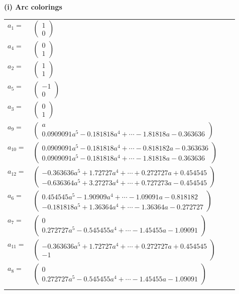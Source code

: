 \documentclass[1p]{elsarticle_modified}
\theoremstyle{definition}
\begin{document}
\flushleft \textbf{(i) Arc colorings}\\
\begin{tabular}{m{7pt} m{180pt} m{7pt} m{180pt} }
\flushright $a_{1}=$&$\begin{pmatrix}1\\0\end{pmatrix}$ \\
\flushright $a_{4}=$&$\begin{pmatrix}0\\1\end{pmatrix}$ \\
\flushright $a_{2}=$&$\begin{pmatrix}1\\1\end{pmatrix}$ \\
\flushright $a_{5}=$&$\begin{pmatrix}-1\\0\end{pmatrix}$ \\
\flushright $a_{3}=$&$\begin{pmatrix}0\\1\end{pmatrix}$ \\
\flushright $a_{9}=$&$\begin{pmatrix}a\\0.0909091 a^{5}-0.181818 a^{4}+\cdots-1.81818 a-0.363636\end{pmatrix}$ \\
\flushright $a_{10}=$&$\begin{pmatrix}0.0909091 a^{5}-0.181818 a^{4}+\cdots-0.818182 a-0.363636\\0.0909091 a^{5}-0.181818 a^{4}+\cdots-1.81818 a-0.363636\end{pmatrix}$ \\
\flushright $a_{12}=$&$\begin{pmatrix}-0.363636 a^{5}+1.72727 a^{4}+\cdots+0.272727 a+0.454545\\-0.636364 a^{5}+3.27273 a^{4}+\cdots+0.727273 a-0.454545\end{pmatrix}$ \\
\flushright $a_{6}=$&$\begin{pmatrix}0.454545 a^{5}-1.90909 a^{4}+\cdots-1.09091 a-0.818182\\-0.181818 a^{5}+1.36364 a^{4}+\cdots-1.36364 a-0.272727\end{pmatrix}$ \\
\flushright $a_{7}=$&$\begin{pmatrix}0\\0.272727 a^{5}-0.545455 a^{4}+\cdots-1.45455 a-1.09091\end{pmatrix}$ \\
\flushright $a_{11}=$&$\begin{pmatrix}-0.363636 a^{5}+1.72727 a^{4}+\cdots+0.272727 a+0.454545\\-1\end{pmatrix}$ \\
\flushright $a_{8}=$&$\begin{pmatrix}0\\0.272727 a^{5}-0.545455 a^{4}+\cdots-1.45455 a-1.09091\end{pmatrix}$\\&\end{tabular}
\end{document}
